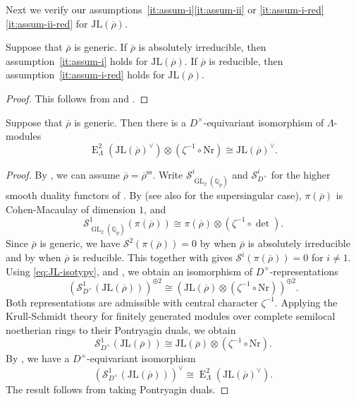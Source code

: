 \documentclass[11pt,a4paper]{article} %
\def\cS{\mathcal{S}}
\def\det{\operatorname{det}}
\def\E{\operatorname{E}}
\def\GL{\operatorname{GL}}
\def\ss{\operatorname{ss}}
\def\Qp{\mathbb{Q}_p}
\def\rhobar{\overline{\rho}}
\begin{document}
Next we verify our assumptions~\ref{it:assum-i}\ref{it:assum-ii} or \ref{it:assum-i-red}\ref{it:assum-ii-red} for $\mathrm{JL}(\rhobar)$.

\begin{proposition}\label{prop:JL-graded}
    Suppose that $\rhobar$ is generic. If $\rhobar$ is absolutely irreducible, then assumption~\ref{it:assum-i} holds for $\mathrm{JL}(\rhobar)$. If $\rhobar$ is reducible, then assumption~\ref{it:assum-i-red} holds for $\mathrm{JL}(\rhobar)$.
\end{proposition}

\begin{proof}
    This follows from \cite[Theorem 4.17]{HW24a} and \cite[Proposition 6.1]{HW24b}.
\end{proof}

\begin{proposition}\label{prop:JL-self-duality}
    Suppose that $\rhobar$ is generic. Then there is a $D^\times$-equivariant isomorphism of $\Lambda$-modules
    \[
    \E^2_\Lambda\left(\mathrm{JL}(\rhobar)^\vee\right)
    \otimes(\zeta^{-1}\circ\mathrm{Nr})
    \cong\mathrm{JL}(\rhobar)^\vee.
    \]
\end{proposition}

\begin{proof}
    By \cite[Theorem 1.3(ii)(a)]{HW24b}, we can assume $\rhobar=\rhobar^{\ss}.$ Write $\cS^i_{\GL_2(\Qp)}$ and $\cS^i_{D^\times}$ for the higher smooth duality functors of \cite{Koh17}. By \cite[Proposition 5.4 and Theorem 5.13]{Koh17} (see also \cite[Theorem 1.1]{Wit18} for the supersingular case), $\pi(\rhobar)$ is Cohen-Macaulay of dimension $1$, and
    \[
    \cS^1_{\GL_2(\Qp)}(\pi(\rhobar))
    \cong\pi(\rhobar)\otimes(\zeta^{-1}\circ\det).
    \]
    Since $\rhobar$ is generic, we have $\cS^2(\pi(\rhobar))=0$ by \cite[Theorem 1.2]{HW24b} when $\rhobar$ is absolutely irreducible and by \cite[Theorem 4.6]{Lud17} when $\rhobar$ is reducible. This together with \cite[Theorem 3.2 and Proposition 4.7]{Sch18} gives $\cS^i(\pi(\rhobar))=0$ for $i\ne1$.
    Using \eqref{eq:JL-isotypy}, \cite[Proposition 4.5]{HM26} and \cite[Lemma 7.4]{DPS23}, we obtain an isomorphism of $D^\times$-representations
    \[
    \left(\cS^1_{D^\times}(\mathrm{JL}(\rhobar))\right)^{\oplus2}
    \cong\left(\mathrm{JL}(\rhobar)\otimes(\zeta^{-1}\circ\mathrm{Nr})\right)^{\oplus2}.
    \]
    Both representations are admissible with central character $\zeta^{-1}$. Applying the Krull-Schmidt theory for finitely generated modules over complete semilocal noetherian rings \cite[Theorem B]{Row87} to their Pontryagin duals, we obtain
    \[
    \cS^1_{D^\times}(\mathrm{JL}(\rhobar))
    \cong\mathrm{JL}(\rhobar)\otimes(\zeta^{-1}\circ\mathrm{Nr}).
    \]
    By \cite[Corollary 3.15 and Theorems 4.1, 5.1]{Koh17}, we have a $D^\times$-equivariant isomorphism
    \[
    \left(\cS^1_{D^\times}(\mathrm{JL}(\rhobar))\right)^\vee
    \cong\E^2_\Lambda\left(\mathrm{JL}(\rhobar)^\vee\right).
    \]
    The result follows from taking Pontryagin duals. 
\end{proof}
\end{document}
